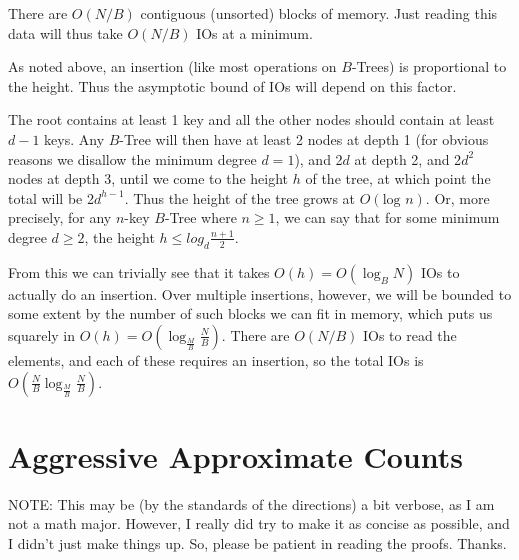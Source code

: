 \documentclass[fleqn]{article}
\begin{document}
There are $O(N/B)$ contiguous (unsorted) blocks of memory. Just reading this data will thus take $O(N/B)$ IOs at a minimum.

As noted above, an insertion (like most operations on $B$-Trees) is proportional to the height. Thus the asymptotic bound of IOs will depend on this factor.

The root contains at least 1 key and all the other nodes should contain at least $d - 1$ keys. Any $B$-Tree will then have at least 2 nodes at depth 1 (for obvious reasons we disallow the minimum degree $d = 1$), and 2$d$ at depth 2, and 2$d^2$ nodes at depth 3, until we come to the height $h$ of the tree, at which point the total will be 2$d^{h-1}$. Thus the height of the tree grows at $O(\mbox{log } n)$. Or, more precisely, for any $n$-key $B$-Tree where $n \ge 1$, we can say that for some minimum degree $d \ge 2$, the height $h \le log_d \frac{n+1}{2}$.

From this we can trivially see that it takes $O(h) = O(\log_B N)$ IOs to actually do an insertion. Over multiple insertions, however, we will be bounded to some extent by the number of such blocks we can fit in memory, which puts us squarely in $O(h) = O(\log_\frac{M}{B} \frac{N}{B})$. There are $O(N/B)$ IOs to read the elements, and each of these requires an insertion, so the total IOs is $O(\frac{N}{B} \log_\frac{M}{B} \frac{N}{B})$.


\section{Aggressive Approximate Counts}

NOTE: This may be (by the standards of the directions) a bit verbose, as I am not a math major. However, I really did try to make it as concise as possible, and I didn't just make things up. So, please be patient in reading the proofs. Thanks.
\end{document}
